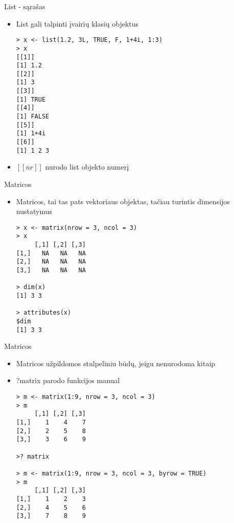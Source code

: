 \documentclass[11pt,xcolor=table]{beamer}
\begin{document}

\begin{frame}[fragile]{List - sąrašas}
\begin{itemize}
\item List gali talpinti įvairių klasių objektus
\begin{lstlisting}
> x <- list(1.2, 3L, TRUE, F, 1+4i, 1:3) 
> x
[[1]]
[1] 1.2
[[2]]
[1] 3
[[3]]
[1] TRUE
[[4]]
[1] FALSE
[[5]]
[1] 1+4i
[[6]]
[1] 1 2 3
\end{lstlisting}
\item $[[nr]]$  nurodo list objekto numerį
\end{itemize}
\end{frame}


\begin{frame}[fragile]{Matricos}
\begin{itemize}
\item Matricos, tai tas pats vektoriaus objektas, tačiau turintis dimensijos nustatymus
\begin{lstlisting}
> x <- matrix(nrow = 3, ncol = 3)
> x
     [,1] [,2] [,3]
[1,]   NA   NA   NA
[2,]   NA   NA   NA
[3,]   NA   NA   NA

> dim(x)
[1] 3 3

> attributes(x)
$dim
[1] 3 3
\end{lstlisting}
\end{itemize}
\end{frame}


\begin{frame}[fragile]{Matricos}
\begin{itemize}
\item Matricos užpildomos stulpeliniu būdų, jeigu nenurodoma kitaip
\item ?matrix parodo funkcijos manual
\begin{lstlisting}
> m <- matrix(1:9, nrow = 3, ncol = 3)
> m
     [,1] [,2] [,3]
[1,]    1    4    7
[2,]    2    5    8
[3,]    3    6    9

>? matrix

> m <- matrix(1:9, nrow = 3, ncol = 3, byrow = TRUE)
> m
     [,1] [,2] [,3]
[1,]    1    2    3
[2,]    4    5    6
[3,]    7    8    9

\end{lstlisting}
\end{itemize}
\end{frame}
\end{document}
